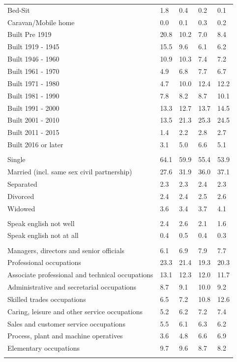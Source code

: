 \documentclass{article}
\begin{document}
\begin{table}[h]
\begin{tabular}{KTTTT}
Bed-Sit & 1.8& 0.4& 0.2& 0.1\\
Caravan/Mobile home & 0.0& 0.1& 0.3& 0.2\\
    \hline
Built Pre 1919 & 20.8& 10.2&  7.0&  8.4\\
Built 1919 - 1945 & 15.5&  9.6&  6.1&  6.2\\
Built  1946 - 1960 & 10.9& 10.3&  7.4&  7.2\\
Built  1961 - 1970 & 4.9& 6.8& 7.7& 6.7\\
Built  1971 - 1980 &  4.7& 10.0& 12.4& 12.2\\
Built  1981 - 1990 &  7.8&  8.2&  8.7& 10.1\\
Built  1991 - 2000 & 13.3& 12.7& 13.7& 14.5\\
Built  2001 - 2010 & 13.5& 21.3& 25.3& 24.5\\
Built  2011 - 2015 & 1.4& 2.2& 2.8& 2.7\\
Built  2016 or later & 3.1& 5.0& 6.6& 5.1\\
\hline
    \\
    \hline
Single & 64.1& 59.9& 55.4& 53.9\\
Married (incl. same sex civil partnership) & 27.6& 31.9& 36.0& 37.1\\
Separated  & 2.3& 2.3& 2.4& 2.3\\
Divorced  & 2.4& 2.4& 2.5& 2.6\\
Widowed & 3.6& 3.4& 3.7& 4.1\\
\hline
    \\ 
    \hline
Speak english not well & 2.4& 2.6& 2.1& 1.6\\
Speak english not at all & 0.4& 0.5& 0.4& 0.3\\
\hline
    \\
    \hline
Managers, directors and senior officials & 6.1& 6.9& 7.9& 7.7\\
Professional occupations & 23.3& 21.4& 19.3& 20.3\\
Associate professional and technical occupations & 13.1& 12.3& 12.0& 11.7\\
Administrative and secretarial occupations &  8.7&  9.1& 10.0&  9.2\\
Skilled trades occupations &  6.5&  7.2& 10.8& 12.6\\
Caring, leisure and other service occupations & 5.2& 6.2& 7.2& 7.4\\
Sales and customer service occupations & 5.5& 6.1& 6.3& 6.2\\
Process, plant and machine operatives & 3.6& 4.8& 6.6& 6.9\\
Elementary occupations & 9.7& 9.6& 8.7& 8.2\\
\hline
\end{tabular}
\end{table}
\end{document}
